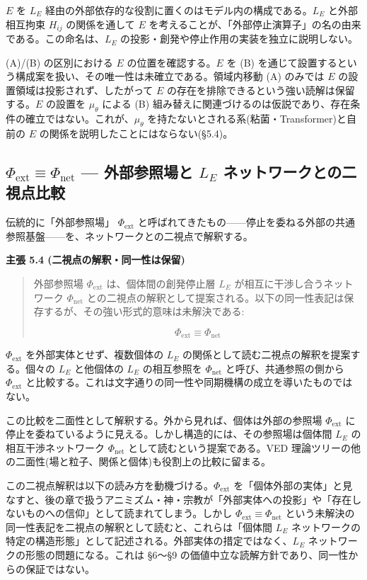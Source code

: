 $E$ を $L_E$ 経由の外部依存的な役割に置くのはモデル内の構成である。$L_E$ と外部相互拘束 $H_{ij}$ の関係を通して $E$ を考えることが、「外部停止演算子」の名の由来である。この命名は、$L_E$ の投影・創発や停止作用の実装を独立に説明しない。

(A)/(B) の区別における $E$ の位置を確認する。$E$ を (B) を通じて設置するという構成案を扱い、その唯一性は未確立である。領域内移動 (A) のみでは $E$ の設置領域は投影されず、したがって $E$ の存在を排除できるという強い読解は保留する。$E$ の設置を $\mu_\theta$ による (B) 組み替えに関連づけるのは仮説であり、存在条件の確立ではない。これが、$\mu_\theta$ を持たないとされる系(粘菌・Transformer)と自前の $E$ の関係を説明したことにはならない(\S{}5.4)。

\bigskip


\subsection{$\Phi_{\text{ext}} \equiv \Phi_{\text{net}}$ — 外部参照場と $L_E$ ネットワークとの二視点比較}


伝統的に「外部参照場」 $\Phi_{\text{ext}}$ と呼ばれてきたもの——停止を委ねる外部の共通参照基盤——を、ネットワークとの二視点で解釈する。

\textbf{主張 5.4 (二視点の解釈・同一性は保留)}

\begin{quote}
外部参照場 $\Phi_{\text{ext}}$ は、個体間の創発停止層 $L_E$ が相互に干渉し合うネットワーク $\Phi_{\text{net}}$ との二視点の解釈として提案される。以下の同一性表記は保存するが、その強い形式的意味は未解決である:

$$
\Phi_{\text{ext}} \equiv \Phi_{\text{net}}
$$
\end{quote}


$\Phi_{\text{ext}}$ を外部実体とせず、複数個体の $L_E$ の関係として読む二視点の解釈を提案する。個々の $L_E$ と他個体の $L_E$ の相互参照を $\Phi_{\text{net}}$ と呼び、共通参照の側から $\Phi_{\text{ext}}$ と比較する。これは文字通りの同一性や同期機構の成立を導いたものではない。

この比較を二面性として解釈する。外から見れば、個体は外部の参照場 $\Phi_{\text{ext}}$ に停止を委ねているように見える。しかし構造的には、その参照場は個体間 $L_E$ の相互干渉ネットワーク $\Phi_{\text{net}}$ として読むという提案である。VED 理論ツリーの他の二面性(場と粒子、関係と個体)も役割上の比較に留まる。

この二視点解釈は以下の読み方を動機づける。$\Phi_{\text{ext}}$ を「個体外部の実体」と見なすと、後の章で扱うアニミズム・神・宗教が「外部実体への投影」や「存在しないものへの信仰」として読まれてしまう。しかし $\Phi_{\text{ext}} \equiv \Phi_{\text{net}}$ という未解決の同一性表記を二視点の解釈として読むと、これらは「個体間 $L_E$ ネットワークの特定の構造形態」として記述される。外部実体の措定ではなく、$L_E$ ネットワークの形態の問題になる。これは \S{}6〜\S{}9 の価値中立な読解方針であり、同一性からの保証ではない。

